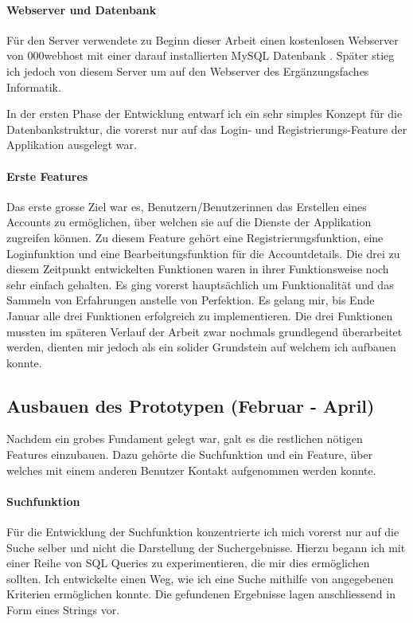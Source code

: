 \documentclass[../main.tex]{subfiles}
\begin{document}
	\paragraph{Webserver und Datenbank}
	Für den Server verwendete zu Beginn dieser Arbeit einen kostenlosen Webserver von 000webhost mit einer darauf installierten MySQL Datenbank \cite{webhost}. Später stieg ich jedoch von diesem Server um auf den Webserver des Ergänzungsfaches Informatik.
	
	In der ersten Phase der Entwicklung entwarf ich ein sehr simples Konzept für die Datenbankstruktur, die vorerst nur auf das Login- und Registrierungs-Feature der Applikation ausgelegt war.
	
	\paragraph{Erste Features}
	Das erste grosse Ziel war es, Benutzern/Benutzerinnen das Erstellen eines Accounts zu ermöglichen, über welchen sie auf die Dienste der Applikation zugreifen können. Zu diesem Feature gehört eine Registrierungsfunktion, eine Loginfunktion und eine Bearbeitungsfunktion für die Accountdetails. Die drei zu diesem Zeitpunkt entwickelten Funktionen waren in ihrer Funktionsweise noch sehr einfach gehalten. Es ging vorerst hauptsächlich um Funktionalität und das Sammeln von Erfahrungen anstelle von Perfektion. Es gelang mir, bis Ende Januar alle drei Funktionen erfolgreich zu implementieren. Die drei Funktionen mussten im späteren Verlauf der Arbeit zwar nochmals grundlegend überarbeitet werden, dienten mir jedoch als ein solider Grundstein auf welchem ich aufbauen konnte.
	
	\subsection{Ausbauen des Prototypen (Februar - April)}
	Nachdem ein grobes Fundament gelegt war, galt es die restlichen nötigen Features einzubauen. Dazu gehörte die Suchfunktion und ein Feature, über welches mit einem anderen Benutzer Kontakt aufgenommen werden konnte.
	\paragraph{Suchfunktion}
	Für die Entwicklung der Suchfunktion konzentrierte ich mich vorerst nur auf die Suche selber und nicht die Darstellung der Suchergebnisse. Hierzu begann ich mit einer Reihe von SQL Queries zu experimentieren, die mir dies ermöglichen sollten. Ich entwickelte einen Weg, wie ich eine Suche mithilfe von angegebenen Kriterien ermöglichen konnte. Die gefundenen Ergebnisse lagen anschliessend in Form eines Strings vor. 
	
\end{document}
